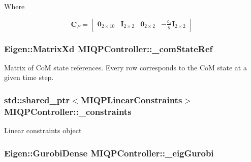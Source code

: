 \-Where

\[ \mathbf{C}_P = \left[ \begin{array}{ccccc} \mathbf{0}_{2\times10} & \mathbf{I}_{2\times2} & \mathbf{0}_{2\times2} & -\frac{c_z}{g}\mathbf{I}_{2\times2} \end{array}\right] \] \hypertarget{classMIQPController_ab74859a8dd208f3fc7608391d318d469}{
\subsubsection[{\-\_\-com\-State\-Ref}]{\setlength{\rightskip}{0pt plus 5cm}\-Eigen\-::\-Matrix\-Xd {\bf \-M\-I\-Q\-P\-Controller\-::\-\_\-com\-State\-Ref}}}\label{classMIQPController_ab74859a8dd208f3fc7608391d318d469}
\-Matrix of \-Co\-M state references. \-Every row corresponds to the \-Co\-M state at a given time step. \hypertarget{classMIQPController_affac62ccd729155720b16de3137ef3f5}{
\subsubsection[{\-\_\-constraints}]{\setlength{\rightskip}{0pt plus 5cm}std\-::shared\-\_\-ptr$<${\bf \-M\-I\-Q\-P\-Linear\-Constraints}$>$ {\bf \-M\-I\-Q\-P\-Controller\-::\-\_\-constraints}}}\label{classMIQPController_affac62ccd729155720b16de3137ef3f5}
\-Linear constraints object \hypertarget{classMIQPController_a6d15db521a6b9c4e0b641709fef77373}{
\subsubsection[{\-\_\-eig\-Gurobi}]{\setlength{\rightskip}{0pt plus 5cm}\-Eigen\-::\-Gurobi\-Dense {\bf \-M\-I\-Q\-P\-Controller\-::\-\_\-eig\-Gurobi}}}\label{classMIQPController_a6d15db521a6b9c4e0b641709fef77373}
